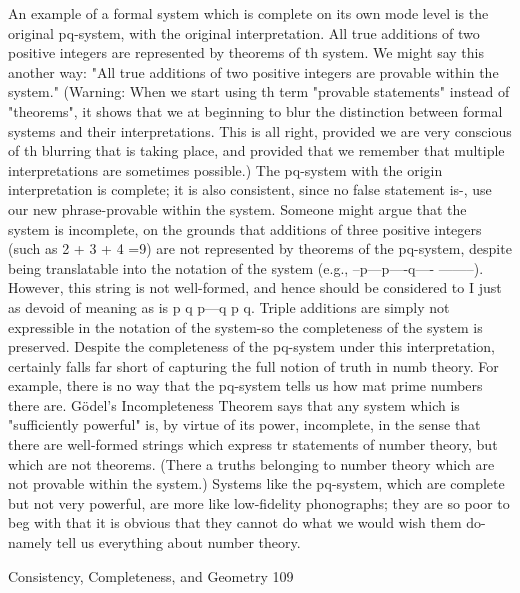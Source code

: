          An example of a formal system which is complete on its own mode level is the
original pq-system, with the original interpretation. All true additions of two positive
integers are represented by theorems of th system. We might say this another way: "All
true additions of two positive integers are provable within the system." (Warning: When
we start using th term "provable statements" instead of "theorems", it shows that we at
beginning to blur the distinction between formal systems and their interpretations. This is
all right, provided we are very conscious of th blurring that is taking place, and provided
that we remember that multiple interpretations are sometimes possible.) The pq-system
with the origin interpretation is complete; it is also consistent, since no false statement is-,
use our new phrase-provable within the system.
         Someone might argue that the system is incomplete, on the grounds that additions
of three positive integers (such as 2 + 3 + 4 =9) are not represented by theorems of the
pq-system, despite being translatable into the notation of the system (e.g., --p---p----q----
--------). However, this string is not well-formed, and hence should be considered to I just
as devoid of meaning as is p q p---q p q. Triple additions are simply not expressible in
the notation of the system-so the completeness of the system is preserved.
         Despite the completeness of the pq-system under this interpretation, certainly falls
far short of capturing the full notion of truth in numb theory. For example, there is no
way that the pq-system tells us how mat prime numbers there are. Gödel’s
Incompleteness Theorem says that any system which is "sufficiently powerful" is, by
virtue of its power, incomplete, in the sense that there are well-formed strings which
express tr statements of number theory, but which are not theorems. (There a truths
belonging to number theory which are not provable within the system.) Systems like the
pq-system, which are complete but not very powerful, are more like low-fidelity
phonographs; they are so poor to beg with that it is obvious that they cannot do what we
would wish them do-namely tell us everything about number theory.




Consistency, Completeness, and Geometry                                                    109

